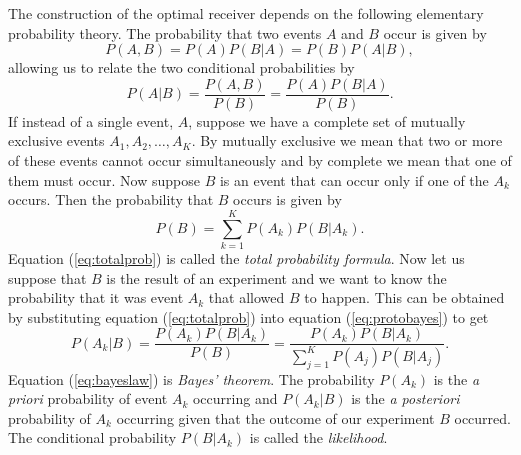 The construction of the optimal receiver depends on the following elementary
probability theory. The probability that two events $A$ and $B$ occur
is given by
\begin{equation}
P(A,B) = P(A) P(B|A) = P(B) P(A|B),
\label{eq:probproduct}
\end{equation}
allowing us to relate the two conditional probabilities by
\begin{equation}
P(A|B) = \frac{P(A,B)}{P(B)} = \frac{P(A)P(B|A)}{P(B)}.
\label{eq:protobayes}
\end{equation}
If instead of a single event, $A$, suppose we have a complete set of mutually
exclusive events $A_1, A_2, \ldots, A_K$. By mutually exclusive we mean that
two or more of these events cannot occur simultaneously and by complete we
mean that one of them must occur. Now suppose $B$ is an event that
can occur only if one of the $A_k$ occurs. Then the probability that $B$
occurs is given by
\begin{equation}
P(B) = \sum_{k=1}^K P(A_k)P(B|A_k).
\label{eq:totalprob}
\end{equation}
Equation (\ref{eq:totalprob}) is called the \emph{total probability formula}.
Now let us suppose that $B$ is the result of an experiment and we want to know
the probability that it was event $A_k$ that allowed $B$ to happen. This can
be obtained by substituting equation (\ref{eq:totalprob}) into equation
(\ref{eq:protobayes}) to get
\begin{equation}
P(A_k|B) = \frac{P(A_k)P(B|A_k)}{P(B)} 
= \frac{P(A_k)P(B|A_k)}{\sum_{j=1}^K P(A_j)P(B|A_j)}.
\label{eq:bayeslaw}
\end{equation}
Equation (\ref{eq:bayeslaw}) is \emph{Bayes' theorem}. The probability
$P(A_k)$ is the \emph{a priori} probability of event $A_k$ occurring and
$P(A_k|B)$ is the \emph{a posteriori} probability of $A_k$ occurring given
that the outcome of our experiment $B$ occurred. The conditional probability
$P(B|A_k)$ is called the \emph{likelihood}.


